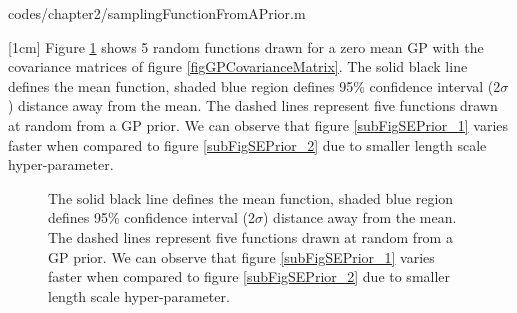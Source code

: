 \begin{mdframed}[hidealllines=true,backgroundcolor=lightgray!20]

                    {codes/chapter2/samplingFunctionFromAPrior.m}
\end{mdframed}

[1cm]
Figure \ref{figGPPriors} shows 5 random functions drawn for a zero mean GP with the covariance matrices of figure \ref{figGPCovarianceMatrix}. The solid black line defines the mean function, shaded blue region defines 95\% confidence interval (2$\sigma$) distance away from the mean. The dashed lines represent five functions drawn at random from a GP prior. We can observe that figure \ref{subFigSEPrior_1} varies faster when compared to figure \ref{subFigSEPrior_2} due to smaller length scale hyper-parameter. 

\begin{figure}[!ht]
  \centering
    \quad
{}\quad
  
       \caption{The solid black line defines the mean function, shaded blue region defines 95\% confidence interval (2$\sigma$) distance away from the mean. The dashed lines represent five functions drawn at random from a GP prior. We can observe that figure \ref{subFigSEPrior_1} varies faster when compared to figure \ref{subFigSEPrior_2} due to smaller length scale hyper-parameter.       }\label{figGPPriors}
\end{figure}



